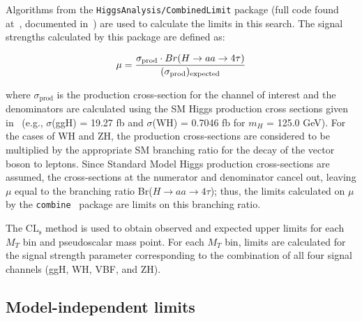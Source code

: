 Algorithms from the \texttt{HiggsAnalysis/CombinedLimit} package (full code found at~\cite{CombinedGitHub}, documented in~\cite{CombinedTwiki}) are used to calculate the limits in this search. The signal strengths calculated by this package are defined as:

\begin{equation}
\mu = \frac{\sigma_{\text{prod}}\cdot Br(H\rightarrow aa \rightarrow4\tau)}{(\sigma_{\text{prod}})_{\text{expected}}} \\
\label{eq:rDefinition}
\end{equation}

where $\sigma_{\text{prod}}$ is the production cross-section for the channel of interest and the denominators are calculated using the SM Higgs production cross sections given in~\cite{LHCHXSWG} (e.g., $\sigma$(ggH) = 19.27 fb and $\sigma$(WH) = 0.7046 fb for $m_{H}$ = 125.0 GeV). For the cases of WH and ZH, the production cross-sections are considered to be multiplied by the appropriate SM branching ratio for the decay of the vector boson to leptons. Since Standard Model Higgs production cross-sections are assumed, the cross-sections at the numerator and denominator cancel out, leaving $\mu$ equal to the branching ratio Br($H\rightarrow$$aa$$\rightarrow4\tau$); thus, the limits calculated on $\mu$ by the \texttt{combine}~\cite{springerlink:10.1140/epjc/s10052-011-1554-0} package are limits on this branching ratio.

The $\text{CL}_{\text{s}}$ method is used to obtain observed and expected upper limits for each $M_{T}$ bin and pseudoscalar mass point. For each $M_{T}$ bin, limits are calculated for the signal strength parameter corresponding to the combination of all four signal channels (ggH, WH, VBF, and ZH).

\subsection{Model-independent limits\label{sec:results-limits}}


